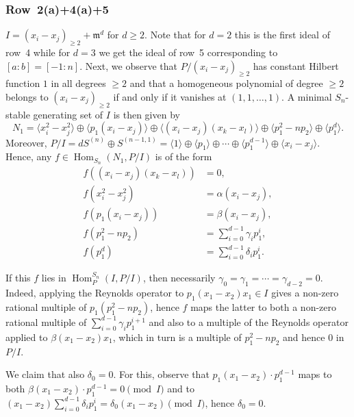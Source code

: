 \documentclass[11pt]{amsart}
\theoremstyle{definition}
\newcommand{\mm}{\mathfrak{m}}
\DeclareMathOperator{\Hom}{Hom}
\begin{document}
\subsubsection{Row~2(a)+4(a)+5} $I = (x_i - x_j)_{\geq 2} + \mm^{d}$ for $d \geq 2$. Note that for $d=2$ this is the first ideal of row~4 while for $d=3$ we get the ideal of row~5 corresponding to $[a:b] = [-1:n]$.
Next, we observe that $P/(x_i-x_j)_{\geq 2}$ has constant Hilbert function $1$ in all degrees $\geq 2$ and that a homogeneous polynomial of degree $\geq 2$ belongs to $(x_i-x_j)_{\geq 2}$ if and only if it vanishes at $(1,1,\ldots,1)$.
A minimal $S_n$-stable generating set of $I$ is then given by
\begin{equation*}
    N_1 = \langle x_i^2 - x_j^2 \rangle \oplus \langle p_1(x_i - x_j)  \rangle \oplus \langle (x_i - x_j)(x_k - x_l) \rangle \oplus \langle p_1^2 - n p_2 \rangle \oplus \langle p_1^d \rangle.
\end{equation*}
Moreover, $P/I = d S^{(n)} \oplus S^{(n-1,1)} = \langle 1 \rangle \oplus \langle p_1 \rangle \oplus \cdots \oplus \langle p_1^{d-1} \rangle \oplus \langle x_i - x_j \rangle$.
Hence, any $f \in \Hom_{S_n}(N_1,P/I)$ is of the form
\begin{align*}
    f((x_i - x_j)(x_k - x_l)) &= 0, \\
    f(x_i^2 - x_j^2) &= \alpha (x_i - x_j), \\
    f(p_1 (x_i - x_j)) &= \beta (x_i - x_j), \\
    f(p_1^2 - n p_2) &= \sum_{i=0}^{d-1} \gamma_i p_1^i, \\
    f(p_1^d) &= \sum_{i=0}^{d-1} \delta_i p_1^i.
\end{align*}

If this $f$ lies in $\Hom^{S_n}_P(I,P/I)$, then necessarily $\gamma_0 = \gamma_1 = \cdots = \gamma_{d-2} = 0$. Indeed, applying the Reynolds operator to $p_1(x_1-x_2)x_1 \in I$ gives a non-zero rational multiple of $p_1(p_1^2 - n p_2)$, hence $f$ maps the latter to both a non-zero rational multiple of $\sum_{i=0}^{d-1} \gamma_i p_1^{i+1}$ and also to a multiple of the Reynolds operator applied to $\beta (x_1 - x_2) x_1$, which in turn is a multiple of $p_1^2 - n p_2$ and hence $0$ in $P/I$.

We claim that also $\delta_0 = 0$. For this, observe that $p_1(x_1-x_2) \cdot p_1^{d-1}$ maps to both $\beta(x_1-x_2) \cdot p_1^{d-1} = 0 \pmod I$ and to $(x_1 - x_2) \sum_{i=0}^{d-1} \delta_i p_1^i = \delta_0(x_1-x_2) \pmod I$, hence $\delta_0 = 0$.
\end{document}
